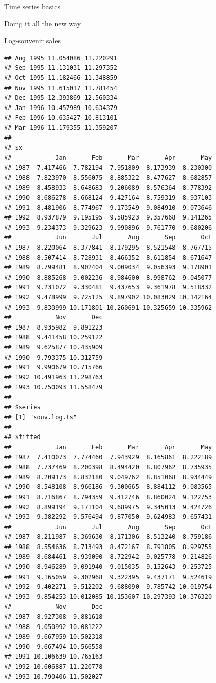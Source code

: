 \documentclass[ignorenonframetext,]{beamer}
\begin{document}
\begin{frame}[fragile]{Time series basics}
\begin{block}{Doing it all the new way}
\begin{block}{Log-souvenir sales}
\begin{verbatim}
## Aug 1995 11.054086 11.220291
## Sep 1995 11.131031 11.297352
## Oct 1995 11.182466 11.348859
## Nov 1995 11.615017 11.781454
## Dec 1995 12.393869 12.560334
## Jan 1996 10.457989 10.634379
## Feb 1996 10.635427 10.813101
## Mar 1996 11.179355 11.359207
## 
## $x
##            Jan       Feb       Mar       Apr       May
## 1987  7.417466  7.782194  7.951809  8.173939  8.230300
## 1988  7.823970  8.556075  8.885322  8.477627  8.682857
## 1989  8.458933  8.648683  9.206089  8.576364  8.778392
## 1990  8.686278  8.668124  9.427164  8.759319  8.937103
## 1991  8.481906  8.774967  9.173549  9.084910  9.073646
## 1992  8.937879  9.195195  9.585923  9.357668  9.141265
## 1993  9.234373  9.329623  9.990896  9.761770  9.680206
##            Jun       Jul       Aug       Sep       Oct
## 1987  8.220064  8.377841  8.179295  8.521548  8.767715
## 1988  8.507414  8.728931  8.466352  8.611854  8.671647
## 1989  8.799481  8.902404  9.009034  9.056393  9.178901
## 1990  8.885268  9.002236  8.984600  8.998762  9.045077
## 1991  9.231072  9.330481  9.437653  9.361978  9.518332
## 1992  9.478999  9.725125  9.897902 10.083029 10.142164
## 1993  9.830999 10.171801 10.260691 10.325659 10.335962
##            Nov       Dec
## 1987  8.935982  9.891223
## 1988  9.441458 10.259122
## 1989  9.625877 10.435909
## 1990  9.793375 10.312759
## 1991  9.990679 10.715766
## 1992 10.491963 11.298763
## 1993 10.750093 11.558479
## 
## $series
## [1] "souv.log.ts"
## 
## $fitted
##            Jan       Feb       Mar       Apr       May
## 1987  7.410073  7.774460  7.943929  8.165861  8.222189
## 1988  7.737469  8.200398  8.494420  8.807962  8.735935
## 1989  8.209173  8.832180  9.049762  8.851068  8.934449
## 1990  8.548108  8.966186  9.300665  8.884112  9.083565
## 1991  8.716867  8.794359  9.412746  8.860024  9.122753
## 1992  8.899194  9.171104  9.689975  9.345013  9.424726
## 1993  9.382292  9.576494  9.877050  9.624983  9.657431
##            Jun       Jul       Aug       Sep       Oct
## 1987  8.211987  8.369630  8.171306  8.513240  8.759186
## 1988  8.554636  8.713493  8.472167  8.791805  8.929755
## 1989  8.684461  8.939090  8.722942  9.025778  9.214826
## 1990  8.946289  9.091940  9.015035  9.152643  9.253725
## 1991  9.165059  9.302968  9.322395  9.437171  9.524619
## 1992  9.402271  9.512202  9.688090  9.785742 10.019754
## 1993  9.854253 10.012085 10.153607 10.297393 10.376320
##            Nov       Dec
## 1987  8.927308  9.881618
## 1988  9.050992 10.081222
## 1989  9.667959 10.502318
## 1990  9.667494 10.566558
## 1991 10.106639 10.765163
## 1992 10.606887 11.220778
## 1993 10.790406 11.502027

\end{verbatim}
\end{block}
\end{block}
\end{frame}
\end{document}
